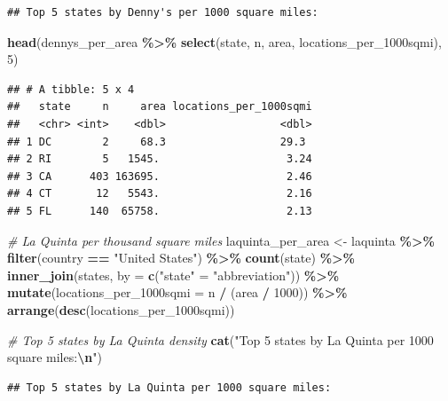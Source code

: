 \documentclass[
]{article}
\newenvironment{Shaded}{\begin{snugshade}}{\end{snugshade}}
\newcommand{\AttributeTok}[1]{\textcolor[rgb]{0.13,0.29,0.53}{#1}}
\newcommand{\CommentTok}[1]{\textcolor[rgb]{0.56,0.35,0.01}{\textit{#1}}}
\newcommand{\DecValTok}[1]{\textcolor[rgb]{0.00,0.00,0.81}{#1}}
\newcommand{\FunctionTok}[1]{\textcolor[rgb]{0.13,0.29,0.53}{\textbf{#1}}}
\newcommand{\NormalTok}[1]{#1}
\newcommand{\OtherTok}[1]{\textcolor[rgb]{0.56,0.35,0.01}{#1}}
\newcommand{\SpecialCharTok}[1]{\textcolor[rgb]{0.81,0.36,0.00}{\textbf{#1}}}
\newcommand{\StringTok}[1]{\textcolor[rgb]{0.31,0.60,0.02}{#1}}
\begin{document}
\begin{verbatim}
## Top 5 states by Denny's per 1000 square miles:
\end{verbatim}

\begin{Shaded}
\begin{Highlighting}[]
\FunctionTok{head}\NormalTok{(dennys\_per\_area }\SpecialCharTok{\%\textgreater{}\%} \FunctionTok{select}\NormalTok{(state, n, area, locations\_per\_1000sqmi), }\DecValTok{5}\NormalTok{)}
\end{Highlighting}
\end{Shaded}

\begin{verbatim}
## # A tibble: 5 x 4
##   state     n     area locations_per_1000sqmi
##   <chr> <int>    <dbl>                  <dbl>
## 1 DC        2     68.3                  29.3 
## 2 RI        5   1545.                    3.24
## 3 CA      403 163695.                    2.46
## 4 CT       12   5543.                    2.16
## 5 FL      140  65758.                    2.13
\end{verbatim}

\begin{Shaded}
\begin{Highlighting}[]
\CommentTok{\# La Quinta per thousand square miles}
\NormalTok{laquinta\_per\_area }\OtherTok{\textless{}{-}}\NormalTok{ laquinta }\SpecialCharTok{\%\textgreater{}\%}
  \FunctionTok{filter}\NormalTok{(country }\SpecialCharTok{==} \StringTok{"United States"}\NormalTok{) }\SpecialCharTok{\%\textgreater{}\%}
  \FunctionTok{count}\NormalTok{(state) }\SpecialCharTok{\%\textgreater{}\%}
  \FunctionTok{inner\_join}\NormalTok{(states, }\AttributeTok{by =} \FunctionTok{c}\NormalTok{(}\StringTok{"state"} \OtherTok{=} \StringTok{"abbreviation"}\NormalTok{)) }\SpecialCharTok{\%\textgreater{}\%}
  \FunctionTok{mutate}\NormalTok{(}\AttributeTok{locations\_per\_1000sqmi =}\NormalTok{ n }\SpecialCharTok{/}\NormalTok{ (area }\SpecialCharTok{/} \DecValTok{1000}\NormalTok{)) }\SpecialCharTok{\%\textgreater{}\%}
  \FunctionTok{arrange}\NormalTok{(}\FunctionTok{desc}\NormalTok{(locations\_per\_1000sqmi))}

\CommentTok{\# Top 5 states by La Quinta density}
\FunctionTok{cat}\NormalTok{(}\StringTok{"Top 5 states by La Quinta per 1000 square miles:}\SpecialCharTok{\textbackslash{}n}\StringTok{"}\NormalTok{)}
\end{Highlighting}
\end{Shaded}

\begin{verbatim}
## Top 5 states by La Quinta per 1000 square miles:
\end{verbatim}
\end{document}
